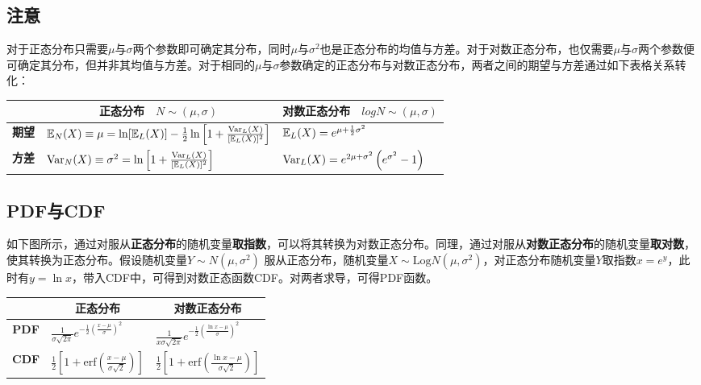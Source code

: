 \documentclass[11pt]{article}
\begin{document}
\subsection*{注意}

对于正态分布只需要$\mu$与$\sigma$两个参数即可确定其分布，同时$\mu$与$\sigma^2$也是正态分布的均值与方差。对于对数正态分布，也仅需要$\mu$与$\sigma$两个参数便可确定其分布，但并非其均值与方差。对于相同的$\mu$与$\sigma$参数确定的正态分布与对数正态分布，两者之间的期望与方差通过如下表格关系转化：
\begin{table}[H]
\centering
\begin{tabular}{@{}cll@{}}
\toprule
\multicolumn{1}{l}{}
& \multicolumn{1}{c}{\textbf{正态分布}$\quad N \sim (\mu,\sigma)$} & \multicolumn{1}{c}{\textbf{对数正态分布}$\quad logN \sim (\mu,\sigma)$} \\
\midrule
\multirow{1}{*}{\textbf{期望}} 
& $\mathbb{E}_N(X) \equiv \mu = \ln[\mathbb{E}_{L}(X)] - \frac{1}{2} \ln \left[1+\frac{\operatorname{Var}_{L}(X)}{[\mathbb{E}_{L}(X)]^2}\right] $ & $\mathbb{E}_{L}(X) = e^{\mu+\frac{1}{2}\sigma^2}$ \\
\textbf{方差} & $\operatorname{Var}_N(X) \equiv \sigma^2 = \ln \left[1+\frac{\operatorname{Var}_{L}(X)}{[\mathbb{E}_{L}(X)]^2}\right]$ & $\operatorname{Var}_{L}(X) = e^{2\mu+\sigma^2} 
\left(e^{\sigma^2} - 1\right)$ \\
\bottomrule
\end{tabular}
\end{table}

\subsection{PDF与CDF}

如下图所示，通过对服从\textbf{正态分布}的随机变量\textbf{取指数}，可以将其转换为对数正态分布。同理，通过对服从\textbf{对数正态分布}的随机变量\textbf{取对数}，使其转换为正态分布。假设随机变量$Y \sim N(\mu,\sigma^2)$ 服从正态分布，随机变量$X \sim \text{Log}N(\mu,\sigma^2)$，对正态分布随机变量$Y$取指数$x=e^y$，此时有$y = \ln x$，带入CDF中，可得到对数正态函数CDF。对两者求导，可得PDF函数。
\begin{table}[H]
\centering
\begin{tabular}{@{}cll@{}}
\toprule
\multicolumn{1}{l}{}
& \multicolumn{1}{c}{\textbf{正态分布}} & \multicolumn{1}{c}{\textbf{对数正态分布}} \\
\midrule
\multirow{1}{*}{\textbf{PDF}} 
& $\frac{1}{\sigma\sqrt{2\pi}} e^{-\frac{1}{2} \left( \frac{x-\mu}{\sigma} \right)^2 } $
& $\frac{1}{x\sigma\sqrt{2\pi}} e^{-\frac{1}{2} \left( \frac{\ln x-\mu}{\sigma} \right)^2 } $ \\
\textbf{CDF} 
& $\frac{1}{2} \left[1 + \text{erf}\left( \frac{x-\mu}{\sigma\sqrt{2}}\right) \right]$
& $\frac{1}{2} \left[1 + \text{erf}\left( \frac{\ln x-\mu}{\sigma\sqrt{2}}\right) \right]$ \\
\bottomrule
\end{tabular}
\end{table}
\end{document}
